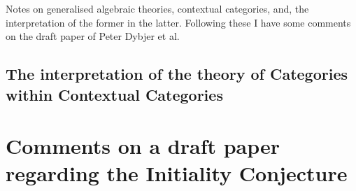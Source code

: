 \documentclass[10pt,a4paper]{article}
\theoremstyle{remark}
\begin{document}
\newcommand{\gatinterpretationmapeqv}[2]{&&&=&\ \ $#1$&#2}

\newcommand{\gatinterpretationaxcond}[5]{
\refstepcounter{equation}(\theequation)\label{#1}& \gatrule{#2}{#3}&$\scriptstyle iff$&&\cellcolor{lightergrey}$#4$&#5}

\newcommand{\gatinterpretationaxeqv}[2]{&&$\scriptstyle iff$&&$#1$&#2}

\newcommand{\duple}[1]{\llangle #1 \rrangle}

\newcommand{\bigtuple}[1]{\big \langle #1 \big \rangle}


Notes on  generalised algebraic theories, contextual categories, and, the interpretation of the former in the latter. Following these I have some comments on the draft paper of Peter Dybjer et al. 

\iffalse  %

\section{Note concerning Generalised Algebraic Theories}


\newpage
\section{Notes concerning Contex
tual Categories}

\section{Note concerning the interpretation of Generalised Algebraic Theories within Contextual Categories}


\subsection{The interpretation of the theory of Monoids within Contextual Categories}
 

\fi %

\subsection{The interpretation of the theory of Categories within Contextual Categories}


\section{Comments on a draft paper regarding the Initiality Conjecture}


%

% 


\end{document}
